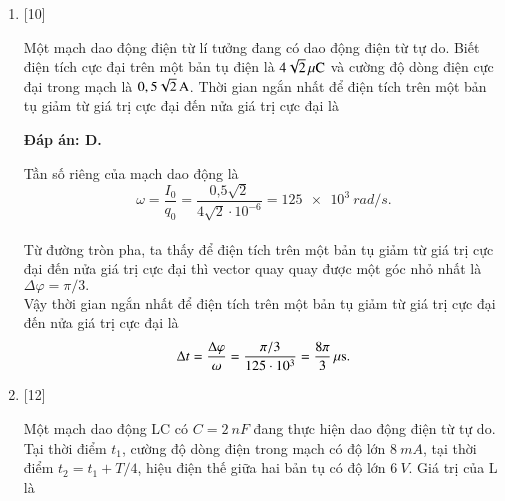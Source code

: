 \begin{enumerate}[label=\bfseries Câu \arabic*:]
{	}
	
	\item {} [10]
	
	{Một mạch dao động điện từ lí tưởng đang có dao động điện từ tự do. Biết điện tích cực đại trên một bản tụ điện là $\xsi{4\sqrt{2}}{\mu C}$ và cường độ dòng điện cực đại trong mạch là $\xsi{0,5\sqrt{2}}{A}$. Thời gian ngắn nhất để điện tích trên một bản tụ giảm từ giá trị cực đại đến nửa giá trị cực đại là
	}
	
	\hideall
	{		\textbf{Đáp án: D.}
		
		Tần số riêng của mạch dao động là 
		$$
		\omega = \dfrac{I_0}{q_0} = \dfrac{\text{0,5} \sqrt{2}}{4 \sqrt{2} \cdot10^{-6}} = \SI{125 e3}{rad/s}.
		$$ \\
		Từ đường tròn pha, ta thấy để điện tích trên một bản tụ giảm từ giá trị cực đại đến nửa giá trị cực đại thì vector quay quay được một góc nhỏ nhất là $\Delta \varphi = \pi /3.$ \\
		Vậy thời gian ngắn nhất để điện tích trên một bản tụ giảm từ giá trị cực đại đến nửa giá trị cực đại là
		$$
		\Delta t = \dfrac{\Delta \varphi}{\omega} = \dfrac{\pi / 3}{125\cdot10^{3}} = \xsi{\dfrac{8\pi}{3}}{\mu s}.
		$$
	}
	
	
	
	\item {} [12]
	
	{Một mạch dao động LC có $C = \SI{2}{nF}$ đang thực hiện dao động điện từ tự do. Tại thời điểm $t_1$, cường độ dòng điện trong mạch có độ lớn $\SI{8}{mA}$, tại thời điểm $t_2 = t_1 +T/4$, hiệu điện thế giữa hai bản tụ có độ lớn $\SI{6}{V}$. Giá trị của L là 
	}
	

\end{enumerate}
